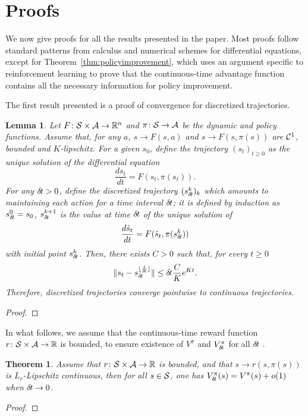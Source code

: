 \documentclass[11pt]{article}
\newtheorem{theorem}{Theorem}
\newtheorem{lemma}{Lemma}
\begin{document}
\section{Proofs}

We now give proofs for all the results presented in the paper. Most
proofs follow standard patterns from calculus and numerical schemes for
differential equations, except for Theorem~\ref{thm:policyimprovement},
which uses an argument specific to reinforcement learning to prove that
the continuous-time advantage function contains all the necessary
information for policy improvement.


The first result presented is a proof of convergence for discretized
trajectories.
\begin{lemma}
	Let $F\colon {\cal S} \times {\cal A} \rightarrow \mathbb{R}^n$ and $\pi\colon {\cal S}
	\rightarrow {\cal A}$ be the dynamic and policy functions. Assume that,
	for any $a$, $s \rightarrow F(s, a)$ and $s \rightarrow F(s, \pi(s))$
	are ${\cal C}^1$, bounded and $K$-lipschitz.  For
	a given $s_0$, define the trajectory $(s_t)_{t\geq 0}$ as the unique
	solution of the differential equation
	\begin{equation}
		\frac{ds_t}{dt} = F(s_t, \pi(s_t)).
		\label{eq:diff}
	\end{equation}
	For any ${\delta\hspace{-.1em}t} > 0$, define the discretized trajectory
	$(s_{\delta\hspace{-.1em}t}^k)_k$ which amounts to maintaining each action for a
	time interval ${\delta\hspace{-.1em}t}$; it is defined by induction as $s_{\delta\hspace{-.1em}t}^0 = s_0$,
	$s_{\delta\hspace{-.1em}t}^{k + 1}$ is the value at time ${\delta\hspace{-.1em}t}$ of
	the unique solution of
	\begin{equation}
		\frac{d\tilde{s}_t}{dt} = F(\tilde{s}_t, \pi(s_{\delta\hspace{-.1em}t}^k))
		\label{eq:diff_2}
	\end{equation}
	with initial point $s_{\delta\hspace{-.1em}t}^k$.
	Then, there exists $C > 0$ such that, for every $t \geq 0$
	\begin{equation}
		\|s_t - s_{\delta\hspace{-.1em}t}^{\lfloor \frac{t}{{\delta\hspace{-.1em}t}} \rfloor}\|
		\leq {\delta\hspace{-.1em}t} \frac{C}{K}e^{Kt}.
	\end{equation}
	Therefore, discretized trajectories converge pointwise to continuous trajectories.
	\label{th:traj-conv}
\end{lemma}
\begin{proof}
	
\end{proof}

In what follows, we assume that the continuous-time reward function $r\colon {\cal S} \times {\cal A} \rightarrow \mathbb{R}$
is bounded, to ensure existence of $V^\pi$ and $V^\pi_{\delta\hspace{-.1em}t}$ for all ${\delta\hspace{-.1em}t}$
.\begin{theorem}
	Assume that $r\colon {\cal S} \times {\cal A} \rightarrow \mathbb{R}$ is bounded, and
	that $s \rightarrow r(s, \pi(s))$ is $L_r$-Lipschitz continuous, then
	for all $s \in {\cal S}$, one has
	$V^\pi_{\delta\hspace{-.1em}t}(s) = V^\pi(s) + o(1)$
	when ${\delta\hspace{-.1em}t}\to 0$.
	\label{th:conv-value}
\end{theorem}
\begin{proof}
	
\end{proof}
\end{document}
